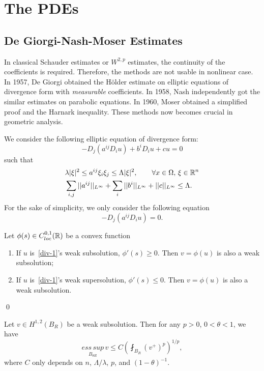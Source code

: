 
\chapter{The PDEs}
\section{De Giorgi-Nash-Moser Estimates}
In classical Schauder estimates or $W^{2,p}$ estimates, the continuity of the coefficients is required. Therefore, the methods are not usable in nonlinear case. In 1957, De Giorgi obtained the H\"older estimate on elliptic equations of divergence form with {\it measurable} coefficients. In 1958, Nash independently got the similar estimates on parabolic equations. In 1960, Moser obtained a simplified proof and the Harnark inequality. These methods now becomes  crucial in geometric analysis.



We consider the following elliptic equation of divergence form:
\begin{equation}\label{div}
-D_j(a^{ij}D_iu)+b^iD_i u+cu=0
\end{equation}
such that 
\begin{align*}
& \lambda|\xi|^2\leq a^{ij}\xi_i\xi_j\leq\Lambda|\xi|^2,\qquad \forall x\in\Omega,\,\xi\in\mathbb R^n
\\
&\sum_{i,j}||a^{ij}||_{L^\infty}+\sum_i||b^i||_{L^\infty}+||c||_{L^\infty}\leq\Lambda.
\end{align*}
For the sake of simplicity, we only consider the following equation
\begin{equation}\label{div-1}
-D_j(a^{ij}D_iu)=0.
\end{equation}

\begin{lemma} Let $\phi(s)\in C_{loc}^{0,1}(\mathbb R)$ be a convex function
\begin{enumerate}
\item If $u$ is~\eqref{div-1}'s weak subsolution, $\phi'(s)\geq 0$. Then $v=\phi(u)$ is also a weak subsolution;
\item If $u$ is~\eqref{div-1}'s weak supersolution, $\phi'(s)\leq 0$. Then $v=\phi(u)$ is also a weak subsolution.
\end{enumerate}
\end{lemma}

\qed

\begin{lemma} Let $v\in H^{1,2}(B_R)$ be a weak subsolution. Then for 
any $p>0$, $0<\theta<1$, we have
\[
\underset{{B_{\theta R}}}{ess\,sup}\, v\leq C\left(\fint_{B_R}(v^+)^p\right)^{1/p},
\]
where $C$ only depends on $n$, $\Lambda/\lambda$, $p$, and $(1-\theta)^{-1}$.
\end{lemma}


